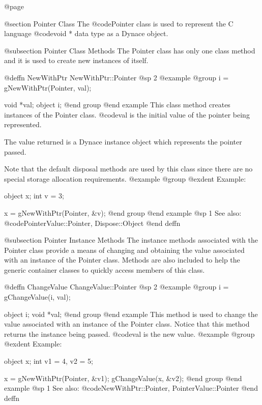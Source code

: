@page

@section Pointer Class
The @code{Pointer} class is used to represent the C language
@code{void *} data type as a Dynace object.





@subsection Pointer Class Methods
The Pointer class has only one class method and it is used to create
new instances of itself.



@deffn {NewWithPtr} NewWithPtr::Pointer
@sp 2
@example
@group
i = gNewWithPtr(Pointer, val);

void    *val;
object  i;
@end group
@end example
This class method creates instances of the Pointer class.  @code{val}
is the initial value of the pointer being represented.  

The value returned is a Dynace instance object which represents the pointer
passed.

Note that the default disposal methods are used by this class since
there are no special storage allocation requirements.
@example
@group
@exdent Example:

object  x;
int     v = 3;

x = gNewWithPtr(Pointer, &v);
@end group
@end example
@sp 1
See also:  @code{PointerValue::Pointer, Dispose::Object}
@end deffn





@subsection Pointer Instance Methods
The instance methods associated with the Pointer class provide a
means of changing and obtaining the value associated with an instance of
the Pointer class.  Methods are also included to help the generic
container classes to quickly access members of this class.






@deffn {ChangeValue} ChangeValue::Pointer
@sp 2
@example
@group
i = gChangeValue(i, val);

object  i;
void    *val;
@end group
@end example
This method is used to change the value associated with an instance of
the Pointer class.  Notice that this method returns the instance
being passed.  @code{val} is the new value.
@example
@group
@exdent Example:

object  x;
int     v1 = 4, v2 = 5;

x = gNewWithPtr(Pointer, &v1);
gChangeValue(x, &v2);
@end group
@end example
@sp 1
See also:  @code{NewWithPtr::Pointer, PointerValue::Pointer}
@end deffn







